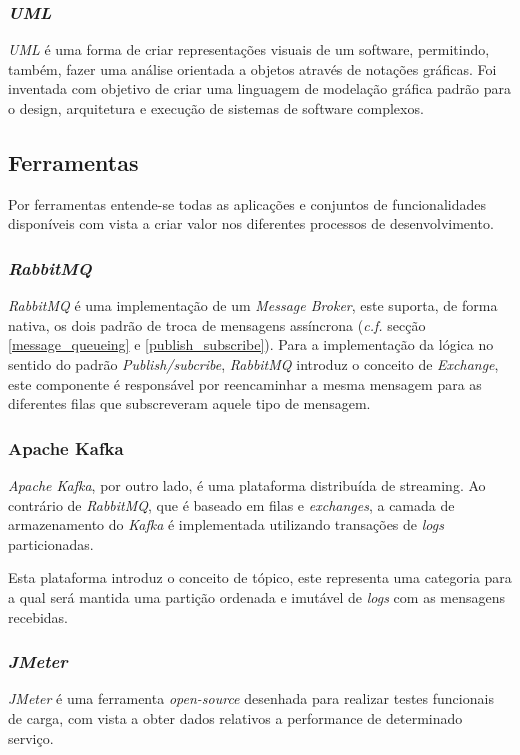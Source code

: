 \subsubsection*{\emph{\acrfull{UML}}}

\emph{\acrshort{UML}} é uma forma de criar representações visuais de um software, permitindo, também, fazer uma análise orientada a objetos através de notações gráficas. Foi inventada com objetivo de criar uma linguagem de modelação gráfica padrão para o design, arquitetura e execução de sistemas de software complexos\cite{uml}.

\subsection{Ferramentas}
Por ferramentas entende-se todas as aplicações e conjuntos de funcionalidades disponíveis com vista a criar valor nos diferentes processos de desenvolvimento\cite{software_tools}.

\subsubsection*{\emph{RabbitMQ}}
\emph{RabbitMQ} é uma implementação de um \emph{Message Broker}, este suporta, de forma nativa, os dois padrão de troca de mensagens assíncrona (\emph{c.f.} secção \ref{message_queueing} e \ref{publish_subscribe}). Para a implementação da lógica no sentido do padrão \emph{Publish/subcribe}, \emph{RabbitMQ} introduz o conceito de \emph{Exchange}, este componente é responsável por reencaminhar a mesma mensagem para as diferentes filas que subscreveram aquele tipo de mensagem.

\subsubsection*{Apache Kafka}
\emph{Apache Kafka}, por outro lado, é uma plataforma distribuída de streaming. Ao contrário de \emph{RabbitMQ}, que é baseado em filas e \emph{exchanges}, a camada de armazenamento do \emph{Kafka} é implementada utilizando transações de \emph{logs} particionadas.

Esta plataforma introduz o conceito de tópico, este representa uma categoria para a qual será mantida uma partição ordenada e imutável de \emph{logs} com as mensagens recebidas.

\subsubsection*{\emph{JMeter} \label{estado_arte_jmeter}}
\emph{JMeter} é uma ferramenta \emph{open-source} desenhada para realizar testes funcionais de carga, com vista a obter dados relativos a performance de determinado serviço\cite{jmeter}.

